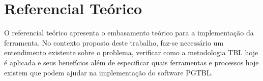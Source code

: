 \chapter[Referencial Teórico]{Referencial Teórico}

O referencial teórico apresenta o embasamento teórico para a implementação da ferramenta. No contexto proposto deste trabalho, faz-se necessário um entendimento existente sobre o problema, verificar como a metodologia TBL hoje é aplicada e seus benefícios além de especificar quais ferramentas e processos hoje existem que podem ajudar na implementação do software PGTBL.
